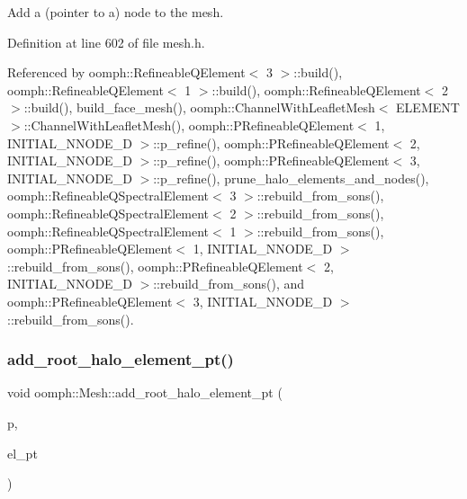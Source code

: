 Add a (pointer to a) node to the mesh. 



Definition at line 602 of file mesh.\+h.



Referenced by oomph\+::\+Refineable\+Q\+Element$<$ 3 $>$\+::build(), oomph\+::\+Refineable\+Q\+Element$<$ 1 $>$\+::build(), oomph\+::\+Refineable\+Q\+Element$<$ 2 $>$\+::build(), build\+\_\+face\+\_\+mesh(), oomph\+::\+Channel\+With\+Leaflet\+Mesh$<$ E\+L\+E\+M\+E\+N\+T $>$\+::\+Channel\+With\+Leaflet\+Mesh(), oomph\+::\+P\+Refineable\+Q\+Element$<$ 1, I\+N\+I\+T\+I\+A\+L\+\_\+\+N\+N\+O\+D\+E\+\_\+D $>$\+::p\+\_\+refine(), oomph\+::\+P\+Refineable\+Q\+Element$<$ 2, I\+N\+I\+T\+I\+A\+L\+\_\+\+N\+N\+O\+D\+E\+\_\+D $>$\+::p\+\_\+refine(), oomph\+::\+P\+Refineable\+Q\+Element$<$ 3, I\+N\+I\+T\+I\+A\+L\+\_\+\+N\+N\+O\+D\+E\+\_\+D $>$\+::p\+\_\+refine(), prune\+\_\+halo\+\_\+elements\+\_\+and\+\_\+nodes(), oomph\+::\+Refineable\+Q\+Spectral\+Element$<$ 3 $>$\+::rebuild\+\_\+from\+\_\+sons(), oomph\+::\+Refineable\+Q\+Spectral\+Element$<$ 2 $>$\+::rebuild\+\_\+from\+\_\+sons(), oomph\+::\+Refineable\+Q\+Spectral\+Element$<$ 1 $>$\+::rebuild\+\_\+from\+\_\+sons(), oomph\+::\+P\+Refineable\+Q\+Element$<$ 1, I\+N\+I\+T\+I\+A\+L\+\_\+\+N\+N\+O\+D\+E\+\_\+D $>$\+::rebuild\+\_\+from\+\_\+sons(), oomph\+::\+P\+Refineable\+Q\+Element$<$ 2, I\+N\+I\+T\+I\+A\+L\+\_\+\+N\+N\+O\+D\+E\+\_\+D $>$\+::rebuild\+\_\+from\+\_\+sons(), and oomph\+::\+P\+Refineable\+Q\+Element$<$ 3, I\+N\+I\+T\+I\+A\+L\+\_\+\+N\+N\+O\+D\+E\+\_\+D $>$\+::rebuild\+\_\+from\+\_\+sons().

\mbox{\label{classoomph_1_1Mesh_a7a1e11514626e7619dfa99acac03ff79}} 
\subsubsection{\texorpdfstring{add\+\_\+root\+\_\+halo\+\_\+element\+\_\+pt()}{add\_root\_halo\_element\_pt()}}
{\footnotesize\ttfamily void oomph\+::\+Mesh\+::add\+\_\+root\+\_\+halo\+\_\+element\+\_\+pt (\begin{DoxyParamCaption}\item[{const unsigned \&}]{p,  }\item[{\hyperlink{classoomph_1_1GeneralisedElement}{Generalised\+Element} $\ast$\&}]{el\+\_\+pt }\end{DoxyParamCaption})\hspace{0.3cm}{\ttfamily [inline]}}



